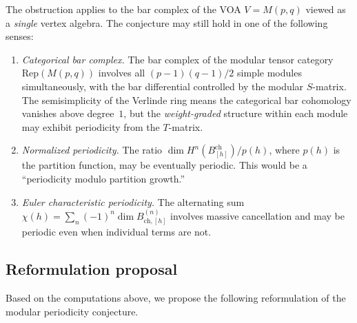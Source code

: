 \documentclass[11pt]{article}
\begin{document}
\begin{remark}
The obstruction applies to the bar complex of the VOA $V = M(p,q)$
viewed as a \emph{single} vertex algebra.  The conjecture may
still hold in one of the following senses:
\begin{enumerate}[nosep]
\item \emph{Categorical bar complex.}
  The bar complex of the modular tensor category
  $\mathrm{Rep}(M(p,q))$ involves all $(p-1)(q-1)/2$ simple
  modules simultaneously, with the bar differential controlled
  by the modular $S$-matrix.  The semisimplicity of the Verlinde
  ring means the categorical bar cohomology vanishes above degree~$1$,
  but the \emph{weight-graded} structure within each module may
  exhibit periodicity from the $T$-matrix.

\item \emph{Normalized periodicity.}
  The ratio $\dim H^n(B_{[h]}^{\mathrm{ch}}) / p(h)$, where $p(h)$
  is the partition function, may be eventually periodic.  This would
  be a ``periodicity modulo partition growth.''

\item \emph{Euler characteristic periodicity.}
  The alternating sum
  $\chi(h) = \sum_n (-1)^n \dim B^{(n)}_{\mathrm{ch},[h]}$
  involves massive cancellation and may be periodic even when
  individual terms are not.
\end{enumerate}
\end{remark}

\subsection{Reformulation proposal}
\label{subsec:mp-reformulation}

Based on the computations above, we propose the following
reformulation of the modular periodicity conjecture.
\end{document}
